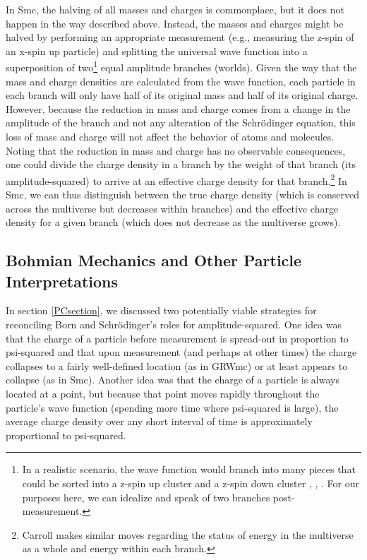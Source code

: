 \documentclass[12pt,onecolumn,secnumarabic,amsmath,amssymb,balancelastpage,nofootinbib]{article}
\begin{document}
In Smc, the halving of all masses and charges is commonplace, but it does not happen in the way described above.  Instead, the masses and charges might be halved by performing an appropriate measurement (e.g., measuring the z-spin of an x-spin up particle) and splitting the universal wave function into a superposition of two\footnote{In a realistic scenario, the wave function would branch into many pieces that could be sorted into a z-spin up cluster and a z-spin down cluster \cite[sec.\ 9]{wallace2007}, \cite{wallace2010}, \cite[sec.\ 3.11]{wallaceQM}.  For our purposes here, we can idealize and speak of two branches post-measurement.} equal amplitude branches (worlds).  Given the way that the mass and charge densities are calculated from the wave function, each particle in each branch will only have half of its original mass and half of its original charge.  However, because the reduction in mass and charge comes from a change in the amplitude of the branch and not any alteration of the Schr\"{o}dinger equation, this loss of mass and charge will not affect the behavior of atoms and molecules.  Noting that the reduction in mass and charge has no observable consequences, one could divide the charge density in a branch by the weight of that branch (its amplitude-squared) to arrive at an effective charge density for that branch.\footnote{Carroll \cite[ch.\ 8]{carroll2019} makes similar moves regarding the status of energy in the multiverse as a whole and energy within each branch.}  In Smc, we can thus distinguish between the true charge density (which is conserved across the multiverse but decreases within branches) and the effective charge density for a given branch (which does not decrease as the multiverse grows).

\subsection{Bohmian Mechanics and Other Particle Interpretations}\label{BMsection}

In section \ref{PCsection}, we discussed two potentially viable strategies for reconciling Born and Schr\"{o}dinger's roles for amplitude-squared.  One idea was that the charge of a particle before measurement is spread-out in proportion to psi-squared and that upon measurement (and perhaps at other times) the charge collapses to a fairly well-defined location (as in GRWmc) or at least appears to collapse (as in Smc).  Another idea was that the charge of a particle is always located at a point, but because that point moves rapidly throughout the particle's wave function (spending more time where psi-squared is large), the average charge density over any short interval of time is approximately proportional to psi-squared.
\end{document}

